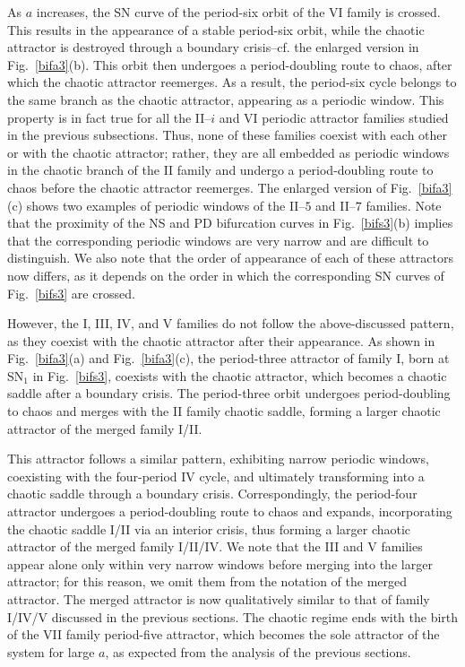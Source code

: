 \documentclass{article}
\theoremstyle{plain}
\theoremstyle{definition}
\begin{document}
As $a$ increases, the SN curve of the period-six orbit of the VI family is crossed. This results in the appearance of a stable period-six orbit, while the chaotic attractor is destroyed through a boundary crisis--cf. the enlarged version in Fig.~\ref{bifa3}(b). This orbit then undergoes a period-doubling route to chaos, after which the chaotic attractor reemerges. As a result, the period-six cycle belongs to the same branch as the chaotic attractor, appearing as a periodic window. This property is in fact true for all the II--$i$ and VI periodic attractor families studied in the previous subsections. Thus, none of these families coexist with each other or with the chaotic attractor; rather, they are all embedded as periodic windows in the chaotic branch of the II family and undergo a period-doubling route to chaos before the chaotic attractor reemerges. The enlarged version of Fig.~\ref{bifa3}(c) shows two examples of periodic windows of the II--$5$ and II--$7$ families. Note that the proximity of the NS and PD bifurcation curves in Fig.~\ref{bifs3}(b) implies that the corresponding periodic windows are very narrow and are difficult to distinguish. We also note that the order of appearance of each of these attractors now differs, as it depends on the order in which the corresponding SN curves of Fig.~\ref{bifs3} are crossed.

However, the I, III, IV, and V families do not follow the above-discussed pattern, as they coexist with the chaotic attractor after their appearance. As shown in Fig.~\ref{bifa3}(a) and Fig.~\ref{bifa3}(c), the period-three attractor of family I, born at SN$_1$ in Fig.~\ref{bifs3}, coexists with the chaotic attractor, which becomes a chaotic saddle after a boundary crisis. The period-three orbit undergoes period-doubling to chaos and merges with the II family chaotic saddle, forming a larger chaotic attractor of the merged family I/II.

This attractor follows a similar pattern, exhibiting narrow periodic windows, coexisting with the four-period IV cycle, and ultimately transforming into a chaotic saddle through a boundary crisis. Correspondingly, the period-four attractor undergoes a period-doubling route to chaos and expands, incorporating the chaotic saddle I/II via an interior crisis, thus forming a larger chaotic attractor of the merged family I/II/IV. We note that the III and V families appear alone only within very narrow windows before merging into the larger attractor; for this reason, we omit them from the notation of the merged attractor. The merged attractor is now qualitatively similar to that of family I/IV/V discussed in the previous sections. The chaotic regime ends with the birth of the VII family period-five attractor, which becomes the sole attractor of the system for large $a$, as expected from the analysis of the previous sections.
 
\end{document}
